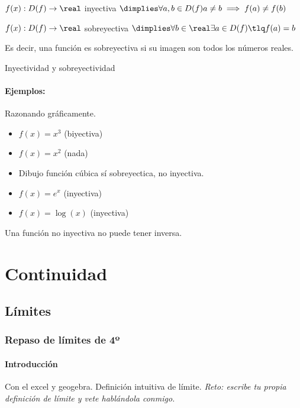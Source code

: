 \documentclass[palatino,nosec]{Docencia}
\begin{document}
\begin{defn}[Inyectividad]
$f(x) : D(f) \to \real$ inyectiva $\dimplies\forall a,b\in D(f) a\neq b \implies f(a) \neq f(b)$
\end{defn} 

\begin{defn}[Sobreyectividad]
	$f(x) : D(f) \to \real$ sobreyectiva $\dimplies \forall b\in\real \exists a\in D(f) \tlq f(a) = b$

	Es decir, una función es sobreyectiva si su imagen son todos los números reales.
\end{defn}


\begin{defn}[Biyectividad] 
	Inyectividad y sobreyectividad
\end{defn}

\paragraph{Ejemplos:} Razonando gráficamente.

\begin{itemize}
	\item $f(x) = x^3$ (biyectiva)
	\item $f(x) = x^2$ (nada)
	\item Dibujo función cúbica sí sobreyectica, no inyectiva.
	\item $f(x) = e^x$ (inyectiva)
	\item $f(x) = \log(x)$ (inyectiva)
\end{itemize}

\obs Una función no inyectiva no puede tener inversa.

\section{Continuidad}
\subsection{Límites}

\subsubsection{Repaso de límites de 4º}

\paragraph{Introducción}

Con el excel y geogebra. Definición intuitiva de límite. \textit{Reto: escribe tu propia definición de límite y vete hablándola conmigo.}
\end{document}
